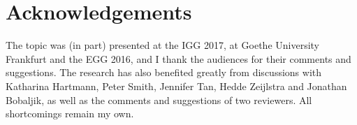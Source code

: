 \documentclass[output=paper
,modfonts
,nonflat]{langsci/langscibook}
\begin{document}
\section*{Acknowledgements}

The topic was (in part) presented at the IGG 2017, at Goethe University Frankfurt and the EGG 2016, and I thank the audiences for their comments and suggestions. The research has also benefited greatly from discussions with Katharina Hartmann, Peter Smith, Jennifer Tan, Hedde Zeijlstra and Jonathan Bobaljik, as well as the comments and suggestions of two reviewers. All shortcomings remain my own.

\printbibliography[heading=subbibliography,notkeyword=this]
\end{document}
